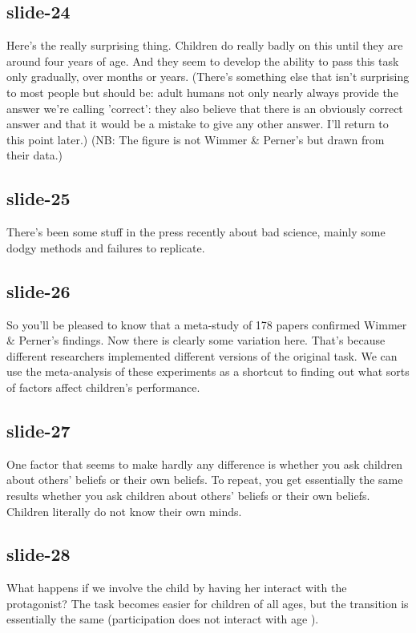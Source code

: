 \documentclass[12pt,\papersize]{extarticle}
\begin{document}
 
\subsection{slide-24}
Here's the really surprising thing.
Children do really badly on this until they are around four years of age.
And they seem to develop the ability to pass this task only gradually, over months or years.
(There's something else that isn't surprising to most people but should be: adult humans not only nearly always provide the answer we're calling 'correct': they also believe that there is an obviously correct answer and that it would be a mistake to give any other answer. I'll return to this point later.)
(NB: The figure is not Wimmer \& Perner's but drawn from their data.)
 
 
\subsection{slide-25}
There's been some stuff in the press recently about bad science, mainly some dodgy methods and failures to replicate.
 
 
\subsection{slide-26}
So you'll be pleased to know that a meta-study of 178 papers confirmed Wimmer \& Perner's findings.
Now there is clearly some variation here.
That's because different researchers implemented different versions of the original task.
We can use the meta-analysis of these experiments as a shortcut to finding out what sorts of factors affect children's performance.
 
 
\subsection{slide-27}
One factor that seems to make hardly any difference is whether you ask children about others' beliefs or their own beliefs.
To repeat, you get essentially the same results whether you ask children about others' beliefs or their own beliefs.
Children literally do not know their own minds.
 
 
\subsection{slide-28}
What happens if we involve the child by having her interact with the protagonist?
The task becomes easier for children of all ages, but the transition is essentially the same (participation does not interact with age \citealp[pp.\ 665-7]{Wellman:2001lz}).
 
\end{document}
